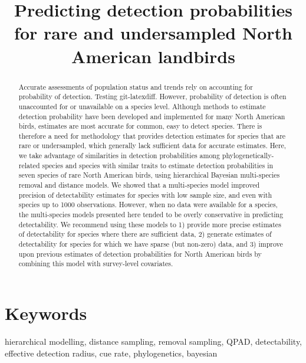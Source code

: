 \documentclass[12pt]{article}
\title{Predicting detection probabilities for rare and undersampled North American landbirds}
\date{}
\begin{document}
\maketitle

\begin{abstract}

		Accurate assessments of population status and trends rely on accounting for probability of detection.
		Testing git-latexdiff.
		However, probability of detection is often unaccounted for or unavailable on a species level. 
		Although methods to estimate detection probability have been developed and implemented for many North American birds, estimates are most accurate for common, easy to detect species. 
		There is therefore a need for methodology that provides detection estimates for species that are rare or undersampled, which generally lack sufficient data for accurate estimates. 
		Here, we take advantage of similarities in detection probabilities among phylogenetically-related species and species with similar traits to estimate detection probabilities in seven species of rare North American birds, using hierarchical Bayesian multi-species removal and distance models. 
		We showed that a multi-species model improved precision of detectability estimates for species with low sample size, and even with species up to 1000 observations.
		However, when no data were available for a species, the multi-species models presented here tended to be overly conservative in predicting detectability. 
		We recommend using these models to 1) provide more precise estimates of detectability for species where there are sufficient data, 2) generate estimates of detectability for species for which we have sparse (but non-zero) data, and 3) improve upon previous estimates of detection probabilities for North American birds by combining this model with survey-level covariates.




\end{abstract}

\section{Keywords}
\par hierarchical modelling, distance sampling, removal sampling, QPAD, detectability, effective detection radius, cue rate, phylogenetics, bayesian
\end{document}
